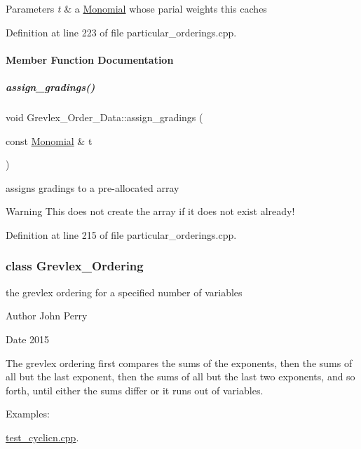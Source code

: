 \begin{DoxyParams}{Parameters}
{\em t} & a \hyperlink{group__polygroup_class_monomial}{Monomial} whose parial weights {\ttfamily this} caches \\
\hline
\end{DoxyParams}


Definition at line 223 of file particular\+\_\+orderings.\+cpp.



\paragraph{Member Function Documentation}
\mbox{\label{group__orderinggroup_aeaf81375ec0b27a6e9c047b1d63c6d55}} 
\subparagraph{\texorpdfstring{assign\+\_\+gradings()}{assign\_gradings()}}
{\footnotesize\ttfamily void Grevlex\+\_\+\+Order\+\_\+\+Data\+::assign\+\_\+gradings (\begin{DoxyParamCaption}\item[{const \hyperlink{group__polygroup_class_monomial}{Monomial} \&}]{t }\end{DoxyParamCaption})}



assigns gradings to a pre-\/allocated array 

\begin{DoxyWarning}{Warning}
This does not create the array if it does not exist already! 
\end{DoxyWarning}


Definition at line 215 of file particular\+\_\+orderings.\+cpp.

\label{class_grevlex___ordering}
\subsubsection{class Grevlex\+\_\+\+Ordering}
the grevlex ordering for a specified number of variables 

\begin{DoxyAuthor}{Author}
John Perry 
\end{DoxyAuthor}
\begin{DoxyDate}{Date}
2015
\end{DoxyDate}
The grevlex ordering first compares the sums of the exponents, then the sums of all but the last exponent, then the sums of all but the last two exponents, and so forth, until either the sums differ or it runs out of variables. \begin{Desc}
\item[Examples\+: ]\par
\hyperlink{test_cyclicn_8cpp-example}{test\+\_\+cyclicn.\+cpp}.\end{Desc}


